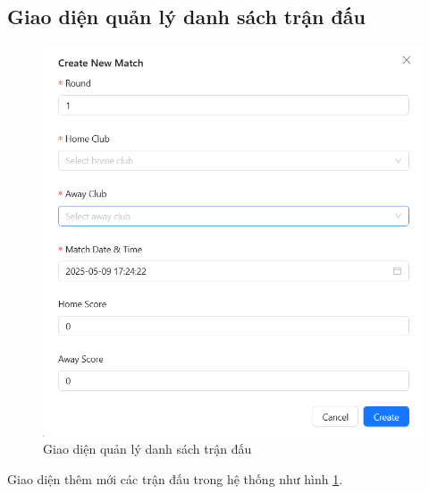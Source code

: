 \documentclass[../BTL.tex]{subfiles}
\begin{document}
\subsection{Giao diện quản lý danh sách trận đấu}
\begin{figure}
    \centering
    \includegraphics[width=1\linewidth]{Hinhve/admin_add_match.png}
    \caption{Giao diện quản lý danh sách trận đấu}
    \label{fig:admin_add_match}
\end{figure}
Giao diện thêm mới các trận đấu trong hệ thống như hình \ref{fig:admin_add_match}. 
\end{document}
